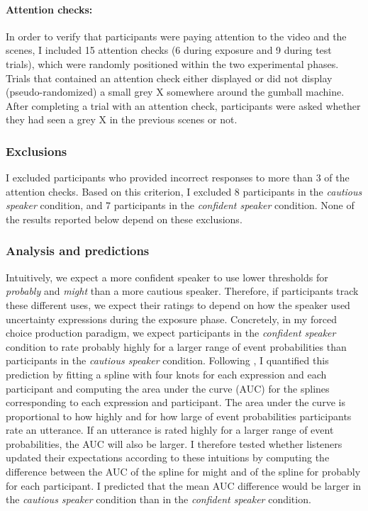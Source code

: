 \paragraph{Attention checks:}  In order to verify that participants were paying attention to the video and the scenes, I included 15 attention checks (6 during exposure and 9 during test trials), which were randomly positioned within the two experimental phases. Trials that contained an attention check either displayed or did not display (pseudo-randomized) a small grey X somewhere around the gumball machine. After completing a trial with an attention check, participants were asked whether they had seen a grey X in the previous scenes or not.

\subsubsection{Exclusions} I excluded participants who provided incorrect responses to more than 3 of the attention checks. Based on this criterion, I excluded 8 participants in the \textit{cautious speaker} condition, and 7 participants in the \textit{confident speaker} condition. None of the results reported below depend on these exclusions.


\subsubsection{Analysis and predictions}  

Intuitively, we expect a more confident speaker to use lower thresholds for {\it probably} and {\it might} than a more cautious speaker.
Therefore, if participants track these different uses, we expect their ratings to depend on how the speaker used uncertainty expressions during the exposure phase. 
Concretely,  in my forced choice production paradigm, we expect participants in the \textit{confident speaker} condition to rate {\sc probably} highly for a larger range of event probabilities than participants
in the \textit{cautious speaker} condition. 
Following \textcite{Yildirim2016}, I quantified this prediction by fitting a spline with four knots for each expression and each participant and computing the area 
under the curve (AUC) for the splines corresponding to each expression and participant. The area under the curve is proportional to how highly and for how large 
of event probabilities participants rate an utterance. If an utterance is rated highly for a larger range of event probabilities, the AUC will also be larger. 
I therefore tested whether listeners updated their expectations according to these intuitions by computing the difference between the AUC of the spline for 
{\sc might} and of the spline for {\sc probably} for each participant. I predicted that the mean AUC difference would be larger in the 
\emph{cautious speaker} condition than in the \emph{confident speaker} condition.

